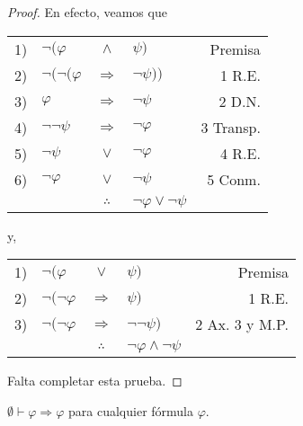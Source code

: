 \documentclass[12pt]{report}
\theoremstyle{largebreak}
\begin{document}
    \begin{proof}
        En efecto, veamos que
        \begin{center}
            \begin{tabular}{l l c l r}
                1) & $\neg(\varphi$ & $\land$ & $\psi)$ & Premisa \\
                2) & $\neg(\neg(\varphi$ & $\Rightarrow$ & $\neg\psi))$ & 1 R.E. \\
                3) & $\varphi$ & $\Rightarrow$ & $\neg\psi$ & 2 D.N. \\
                4) & $\neg\neg\psi$ & $\Rightarrow$ & $\neg\varphi$ & 3 Transp. \\
                5) & $\neg\psi$ & $\lor$ & $\neg\varphi$ & 4 R.E.\\
                6) & $\neg\varphi$ & $\lor$ & $\neg\psi$ & 5 Conm.\\
                \hline
                & & $\therefore$ & $\neg\varphi\lor\neg\psi$ & \\
            \end{tabular}
        \end{center}
        y,
        \begin{center}
            \begin{tabular}{r l c l r}
                1) & $\neg(\varphi$ & $\lor$ & $\psi)$ & Premisa \\
                2) & $\neg(\neg\varphi$ & $\Rightarrow$ & $\psi)$ & 1 R.E. \\
                3) & $\neg(\neg\varphi$ & $\Rightarrow$ & $\neg\neg\psi)$ & 2 Ax. 3 y M.P. \\
                \hline
                & & $\therefore$ & $\neg \varphi\land\neg\psi$ & \\
            \end{tabular}
        \end{center}
        Falta completar esta prueba.%
    \end{proof}

    \begin{lema}
        $\emptyset\vdash\varphi\Rightarrow\varphi$ para cualquier fórmula $\varphi$.
    \end{lema}
\end{document}
